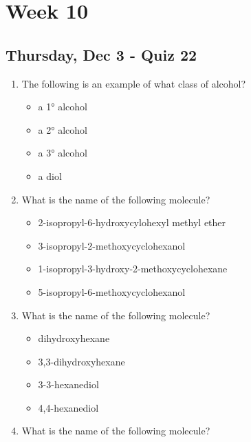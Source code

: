 \documentclass[12pt,a4paper]{article}
\begin{document}
\tableofcontents 
\cleardoublepage{}
\fancyhead{}
\clearpage
\section*{Week 10}

\subsection{Thursday, Dec 3 - Quiz 22}
\begin{enumerate}\color{G-Moon}
    \item The following is an example of what class of alcohol?

    
    \begin{itemize}
        \item a \ang{1} alcohol
        \item {\color{o-Sun}a \ang{2} alcohol}
        \item a \ang{3} alcohol 
        \item a diol
    \end{itemize}
    \item What is the name of the following molecule?


    \begin{itemize}
        \item 2-isopropyl-6-hydroxycylohexyl methyl ether
        \item {\color{o-Sun}3-isopropyl-2-methoxycyclohexanol}
        \item 1-isopropyl-3-hydroxy-2-methoxycyclohexane
        \item 5-isopropyl-6-methoxycyclohexanol
    \end{itemize}
    \item What is the name of the following molecule?


    \begin{itemize}
        \item dihydroxyhexane
        \item 3,3-dihydroxyhexane
        \item {\color{o-Sun}3-3-hexanediol}
        \item 4,4-hexanediol
    \end{itemize}
    \item What is the name of the following molecule?


\end{enumerate}
\end{document}

